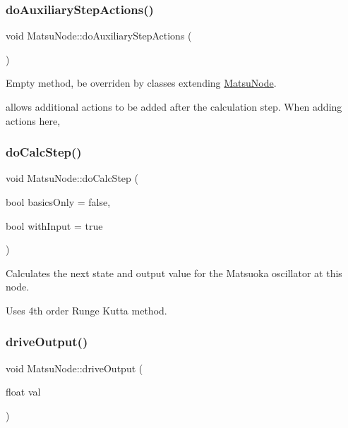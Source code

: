 \mbox{\label{classMatsuNode_a7a537f1cb21eee2652086d022ab41eb8}} 
\subsubsection{\texorpdfstring{do\+Auxiliary\+Step\+Actions()}{doAuxiliaryStepActions()}}
{\footnotesize\ttfamily void Matsu\+Node\+::do\+Auxiliary\+Step\+Actions (\begin{DoxyParamCaption}{ }\end{DoxyParamCaption})}



Empty method, be overriden by classes extending \mbox{\hyperlink{classMatsuNode}{Matsu\+Node}}. 

allows additional actions to be added after the calculation step. When adding actions here, \mbox{\label{classMatsuNode_a10c0280241d0be2e50d89af136d279dc}} 
\subsubsection{\texorpdfstring{do\+Calc\+Step()}{doCalcStep()}}
{\footnotesize\ttfamily void Matsu\+Node\+::do\+Calc\+Step (\begin{DoxyParamCaption}\item[{bool}]{basics\+Only = {\ttfamily false},  }\item[{bool}]{with\+Input = {\ttfamily true} }\end{DoxyParamCaption})}



Calculates the next state and output value for the Matsuoka oscillator at this node. 

Uses 4th order Runge Kutta method. \mbox{\label{classMatsuNode_a64f8db81c0a5df5d7261b36640b399d4}} 
\subsubsection{\texorpdfstring{drive\+Output()}{driveOutput()}}
{\footnotesize\ttfamily void Matsu\+Node\+::drive\+Output (\begin{DoxyParamCaption}\item[{float}]{val }\end{DoxyParamCaption})}

